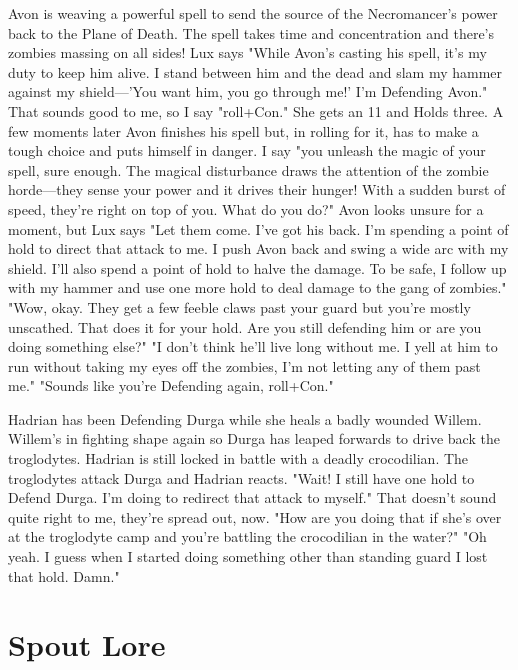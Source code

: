        
\startExample
Avon is weaving a powerful spell to send the source of the Necromancer's power back to the Plane of Death. The spell takes time and concentration and there's zombies massing on all sides! Lux says "While Avon's casting his spell, it's my duty to keep him alive. I stand between him and the dead and slam my hammer against my shield—'You want him, you go through me!' I'm Defending Avon." That sounds good to me, so I say "roll+Con." She gets an 11 and Holds three. A few moments later Avon finishes his spell but, in rolling for it, has to make a tough choice and puts himself in danger. I say "you unleash the magic of your spell, sure enough. The magical disturbance draws the attention of the zombie horde—they sense your power and it drives their hunger! With a sudden burst of speed, they're right on top of you. What do you do?" Avon looks unsure for a moment, but Lux says "Let them come. I've got his back. I'm spending a point of hold to direct that attack to me. I push Avon back and swing a wide arc with my shield. I'll also spend a point of hold to halve the damage. To be safe, I follow up with my hammer and use one more hold to deal damage to the gang of zombies." "Wow, okay. They get a few feeble claws past your guard but you're mostly unscathed. That does it for your hold. Are you still defending him or are you doing something else?" "I don't think he'll live long without me. I yell at him to run without taking my eyes off the zombies, I'm not letting any of them past me." "Sounds like you're Defending again, roll+Con."
\stopExample
       
\startExample
Hadrian has been Defending Durga while she heals a badly wounded Willem. Willem's in fighting shape again so Durga has leaped forwards to drive back the troglodytes. Hadrian is still locked in battle with a deadly crocodilian. The troglodytes attack Durga and Hadrian reacts. "Wait! I still have one hold to Defend Durga. I'm doing to redirect that attack to myself." That doesn't sound quite right to me, they're spread out, now. "How are you doing that if she's over at the troglodyte camp and you're battling the crocodilian in the water?" "Oh yeah. I guess when I started doing something other than standing guard I lost that hold. Damn."
\stopExample
       
\section{Spout Lore}    
       

